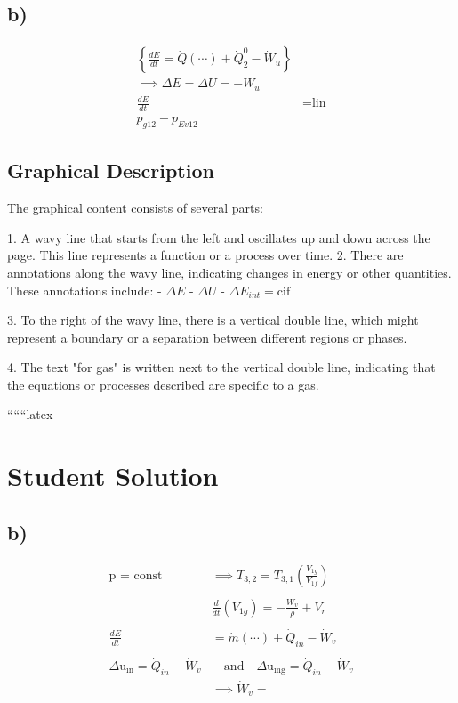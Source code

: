 

\subsection*{b)}

\begin{align*}
\left\{ \frac{dE}{dt} = \dot{Q}(\cdots) + \dot{Q}_2^0 - \dot{W}_u \right\} \\
\implies \Delta E = \Delta U = -W_u \\
\frac{dE}{dt} &= \text{lin} \\
p_{g12} - p_{Ev12}
\end{align*}

\subsection*{Graphical Description}

The graphical content consists of several parts:

1. A wavy line that starts from the left and oscillates up and down across the page. This line represents a function or a process over time.
2. There are annotations along the wavy line, indicating changes in energy or other quantities. These annotations include:
   - $\Delta E$
   - $\Delta U$
   - $\Delta E_{int} = \text{cif}$

3. To the right of the wavy line, there is a vertical double line, which might represent a boundary or a separation between different regions or phases.

4. The text "for gas" is written next to the vertical double line, indicating that the equations or processes described are specific to a gas.

``````latex

\section*{Student Solution}



\subsection*{b)}

\begin{align*}
\text{p = const} & \implies T_{3,2} = T_{3,1} \left( \frac{V_{1g}}{V_{1f}} \right) \\
& \\
& \frac{d}{dt} \left( V_{1g} \right) = - \frac{W_v}{\rho} + V_r \\
& \\
\frac{dE}{dt} & = \dot{m} (\cdots) + \dot{Q}_{in} - \dot{W}_v \\
& \\
\Delta \text{u}_{\text{in}} = \dot{Q}_{in} - \dot{W}_v & \quad \text{and} \quad \Delta \text{u}_{\text{ing}} = \dot{Q}_{in} - \dot{W}_v \\
& \implies \dot{W}_v = 
\end{align*}